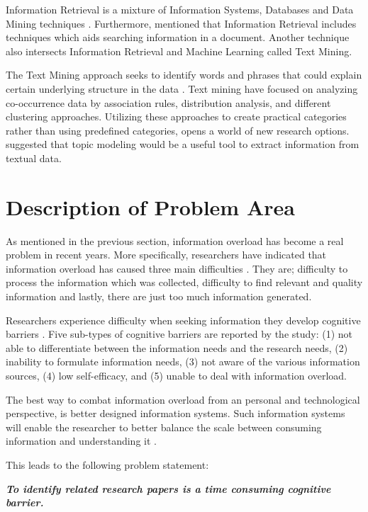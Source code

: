 Information Retrieval is a mixture of Information Systems, Databases and Data Mining techniques \cite{baeza1999modern}. Furthermore,  mentioned that Information Retrieval includes techniques which aids searching information in a document. Another technique also intersects Information Retrieval and Machine Learning called Text Mining.

The Text Mining approach seeks to identify words and phrases that could explain certain underlying structure in the data \cite{hand2014data}. Text mining have focused on analyzing co-occurrence data by association rules, distribution analysis, and different clustering approaches. Utilizing these approaches to create practical categories rather than using predefined categories, opens a world of new research options.  suggested that topic modeling would be a useful tool to extract information from textual data. 

\section{Description of Problem Area} \label{ssec:prob}
As mentioned in the previous section, information overload has become a real problem in recent years. More specifically, researchers have indicated that information overload has caused three main difficulties \cite{al2021exploring}. They are; difficulty to process the information which was collected, difficulty to find relevant and quality information and lastly, there are just too much information generated.

Researchers experience difficulty when seeking information they develop cognitive barriers \cite{savolainen2015cognitive}. Five sub-types of cognitive barriers are reported by the study: (1) not able to differentiate between the information needs and the research needs, (2) inability to formulate information needs, (3) not aware of the various information sources, (4) low self-efficacy, and (5) unable to deal with information overload.

The best way to combat information overload from an personal and technological perspective, is better designed information systems. Such information systems will enable the researcher to better balance the scale between consuming information and understanding it \cite{bawden2020information}.

This leads to the following problem statement:

\textbf{\textit{To identify related research papers is a time consuming cognitive barrier.}}

